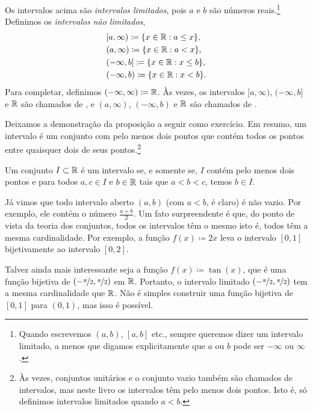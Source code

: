Os intervalos acima são \emph{intervalos limitados}, pois $a$ e $b$ são números reais.\footnote{Quando escrevemos
$(a,b)$, $[a,b]$ etc., sempre queremos dizer um intervalo limitado, a menos que digamos explicitamente
que $a$ ou $b$ pode ser $-\infty$ ou $\infty$.}
Definimos os \emph{intervalos não limitados},
\begin{align*}
& [a,\infty) \coloneqq \{ x \in {\mathbb{R}} : a \leq x \}, \\
& (a,\infty) \coloneqq \{ x \in {\mathbb{R}} : a < x \}, \\
& (-\infty,b] \coloneqq \{ x \in {\mathbb{R}} : x \leq b \}, \\
& (-\infty,b) \coloneqq \{ x \in {\mathbb{R}} : x < b \} .
\end{align*}
Para completar, definimos $(-\infty,\infty) \coloneqq {\mathbb{R}}$.
Às vezes, os intervalos $[a,\infty)$, $(-\infty,b]$ e ${\mathbb{R}}$ são chamados de
\emph{},
e $(a,\infty)$, $(-\infty,b)$ e ${\mathbb{R}}$ são chamados de
\emph{}.

Deixamos a demonstração da proposição a seguir como exercício.
Em resumo, um intervalo é um conjunto com pelo menos dois pontos
que contém todos os pontos entre quaisquer dois
de seus pontos.\footnote{Às vezes, conjuntos unitários e o conjunto vazio
também são chamados de intervalos, mas neste livro os intervalos têm pelo menos dois pontos.
Isto é, só definimos intervalos limitados quando $a < b$.}

\begin{prop} \label{prop:intervaldef}
Um conjunto $I \subset {\mathbb{R}}$ é um intervalo se, e somente se,
$I$ contém pelo menos dois pontos e
para todos $a,c \in I$ e $b \in {\mathbb{R}}$ tais que $a < b < c$, temos $b \in I$.
\end{prop}

Já vimos que todo intervalo aberto $(a,b)$ (com $a < b$, é claro)
é não vazio. Por exemplo, ele contém o número $\frac{a+b}{2}$.
Um fato surpreendente é que, do ponto de vista da teoria dos conjuntos,
todos os intervalos têm o mesmo  isto é, todos têm
a mesma cardinalidade. Por exemplo, a função $f(x) \coloneqq 2x$
leva o intervalo $[0,1]$ bijetivamente ao intervalo $[0,2]$.

Talvez ainda mais interessante seja a função $f(x) \coloneqq \tan(x)$,
que é uma função bijetiva de $(-\nicefrac{\pi}{2},\nicefrac{\pi}{2})$ em ${\mathbb{R}}$. Portanto, o intervalo
limitado $(-\nicefrac{\pi}{2},\nicefrac{\pi}{2})$ tem a mesma cardinalidade que ${\mathbb{R}}$. Não é
simples construir uma função bijetiva de $[0,1]$ para
$(0,1)$, mas isso é possível.

